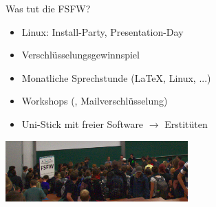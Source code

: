\documentclass[t]{beamer}
\begin{document}
\begin{frame}[label=ct1]{\color{fg}Was tut die FSFW? }
  \begin{itemize}
   \item Linux: Install-Party, Presentation-Day
   \item Verschlüsselungsgewinnspiel
   \item Monatliche {Sprechstunde} (\LaTeX, Linux, ...)
   \item Workshops (, Mailverschlüsselung)
   \item Uni-Stick mit freier Software $\rightarrow$ Erstitüten
  \end{itemize}
  \begin{center}
   \pause
   \includegraphics[width=70mm]{img-src/stick-ausgabe-2017}
  \end{center}
\end{frame}

\end{document}

